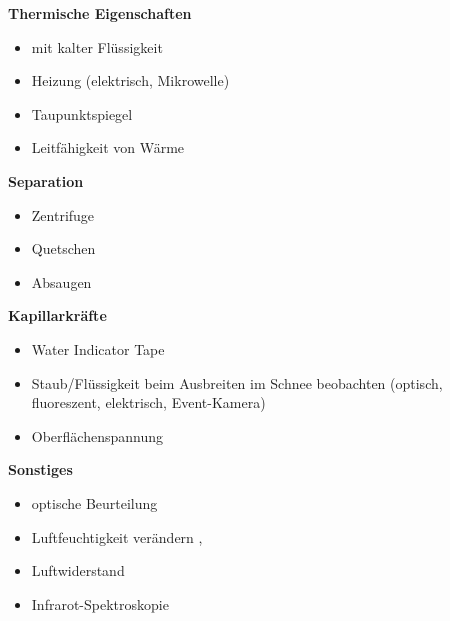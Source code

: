 \textbf{Thermische Eigenschaften}
\begin{itemize}
\item mit kalter Flüssigkeit
\item Heizung (elektrisch, Mikrowelle)
\item Taupunktspiegel
\item Leitfähigkeit von Wärme
\end{itemize}

\textbf{Separation}
\begin{itemize}
\item Zentrifuge
\item Quetschen
\item Absaugen
\end{itemize}

\textbf{Kapillarkräfte}
\begin{itemize}
\item Water Indicator Tape
\item Staub/Flüssigkeit beim Ausbreiten im Schnee beobachten (optisch, fluoreszent, elektrisch, Event-Kamera) \cite{kennedylabs-download}
\item Oberflächenspannung \cite{AlamShibly.2017}
\end{itemize}

\textbf{Sonstiges}
\begin{itemize}
\item optische Beurteilung \cite{miro}
\item Luftfeuchtigkeit verändern \cite{joule-thomson-wiki}, \cite{sensirion-sht4xa-sensors}
\item Luftwiderstand
\item Infrarot-Spektroskopie
\end{itemize}
